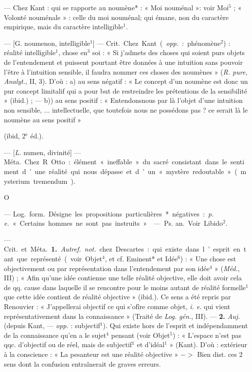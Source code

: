 \begin{itemize}[leftmargin=1cm, label=, itemsep=1pt]
 — Chez Kant : qui se rapporte au noumène* : « Moi nouménal »: voir Moi$^5$ ; « Volonté nouménale » : celle du moi nouménal; qui
émane, non du caractère empirique,
mais du caractère intelligible$^1$.

 — [G. noumenon, intelligible$^1$]
— \si{Crit.} Chez Kant ({\it opp.} : phénomène$^2$) : réalité intelligible$^1$, chose
%
en$^3$ soi : « Si j’admets des choses qui
soient purs objets de l’entendement
et puissent pourtant être données à
une intuition sans pouvoir l'être à
l'intuition sensible, il faudra nommer
ces choses des noumènes » ({\it R. pure},
{\it Analyt.}, II, 3). D'où : a) au sens
négatif : « Le concept d’un noumène
est donc un pur concept limitalif qui
a pour but de restreindre les prétentions de la sensibilité » (ibid.) ;
— b)) au sens positif : « Entendonsnous par là l’objet d’une intuition
non sensible, ... intellectuelle, que
toutefois nous ne possédons pas ? ce
serait là le noumène au sens positif »

(ibid, 2$^\text{e}$ éd.).

 — [{\it L.} numen, divinité] —
\si{Méta.} Chez R. Otto : élément « ineffable » du sacré consistant dans le
sentiment d’une réalité qui nous
dépasse et d’un « mystère redoutable » (mysterium tremendum).

\begin{center}
O
\end{center}

 — \si{Log.} \si{form.} Désigne les propositions particulières* négatives : {\it p. e.}
« Certains hommes ne sont pas instruits. »

 — \si{Ps. an.} Voir Libido$^2$.

 — \si{Crit.} et \si{Méta.} {\bf 1.} {\it Autref.}
{\it not.} chez Descartes : qui existe dans
l’esprit en tant que représenté (voir
Objet$^4$, et cf. Eminent* et Idée$^6$) :
« Une chose est objectivement ou
par représentation dans l’entendement par son idée$^4$ » (\si{{\it Méd.}}, III) ;
« Afin qu’une idée contienne une
telle réalité objective, elle doit avoir
cela de qq. cause dans laquelle il se
rencontre pour le moins autant de
réalité formelle$^1$ que cette idée contient
de réalité objective » (ibid.).
Ce sens a été repris par Renouvier :
« J’appellerai objectif ce qui s’ofîre
comme objet, {\it i. e.} qui vient représentativement dans la connaissance » (Traité de {\it Log. gén.}, III). —
 {\bf 2.} {\it Auj.} (depuis Kant, — {\it opp.} : subjectif$^1$). Qui existe hors de l'esprit et
indépendamment de la connaissance qu’en a le sujet$^4$ pensant (voir
Objet$^5$) : « L’espace n’est pas qqc.
d'objectif ou de réel, mais de subjectif$^1$ et d’idéal$^1$ » (Kant). D'où :
extérieur à la conscience : « La pesanteur est une réalité objective »
$->$ Bien dist. ces 2 sens dont la
confusion entraînerait de graves
erreurs.


\end{itemize}
